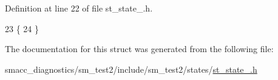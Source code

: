 Definition at line 22 of file st\+\_\+state\+\_.\+h.


\begin{DoxyCode}
23     \{
24     \}
\end{DoxyCode}


The documentation for this struct was generated from the following file\+:\begin{DoxyCompactItemize}
\item 
smacc\+\_\+diagnostics/sm\+\_\+test2/include/sm\+\_\+test2/states/\hyperlink{smacc__diagnostics_2sm__test2_2include_2sm__test2_2states_2st__state__1_8h}{st\+\_\+state\+\_.\+h}\end{DoxyCompactItemize}
